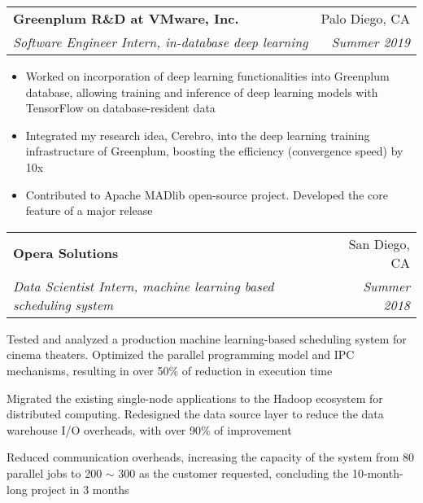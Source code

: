 \documentclass[letterpaper,11pt]{article}
\makeatletter
\newcommand{\resumeItem}[2]{
  \item\small{
    \textbf{#1}{: #2 \vspace{-2pt}}
  }
}
\newcommand{\resumeSubheading}[4]{
  \vspace{-1pt}\item
    \begin{tabular*}{0.97\textwidth}[t]{l@{\extracolsep{\fill}}r}
      \textbf{#1} & #2 \\
      \textit{\small#3} & \textit{\small #4}
    \end{tabular*}\vspace{-5pt}
}
\newcommand{\resumeItemListStart}{\begin{itemize}}
\newcommand{\resumeItemListEnd}{\end{itemize}\vspace{-5pt}}
\makeatother
\begin{document}
    \resumeSubheading
      {Greenplum R\&D at VMware, Inc.}{Palo Diego, CA}
      {Software Engineer Intern, in-database deep learning}{Summer 2019}
      \resumeItemListStart
       \item {\small Worked on incorporation of deep learning functionalities into Greenplum database, allowing training and inference of deep learning models with TensorFlow on database-resident data \vspace{-2pt}}
       \item {\small Integrated my research idea, Cerebro, into the deep learning training infrastructure of Greenplum, boosting the efficiency (convergence speed) by 10x \vspace{-2pt}}
       \item {\small Contributed to Apache MADlib open-source project. Developed the core feature of a major release \vspace{-2pt}}
      \resumeItemListEnd
      
      
      
    \resumeSubheading
      {Opera Solutions}{San Diego, CA}
      {Data Scientist Intern, machine learning based scheduling system}{Summer 2018}
      \resumeItemListStart
      {\small
        \item Tested and analyzed a production machine learning-based scheduling system for cinema theaters. Optimized the parallel programming model and IPC mechanisms, resulting in over 50\% of reduction in execution time \vspace{-2pt}
       \item Migrated the existing single-node applications to the Hadoop ecosystem for distributed computing. Redesigned the data source layer to reduce the data warehouse I/O overheads, with over 90\% of improvement \vspace{-2pt}
       \item Reduced communication overheads, increasing the capacity of the system from 80 parallel jobs to 200 $\sim$ 300 as the customer requested, concluding the 10-month-long project in 3 months \vspace{-2pt}
       }
      \resumeItemListEnd



\end{document}
